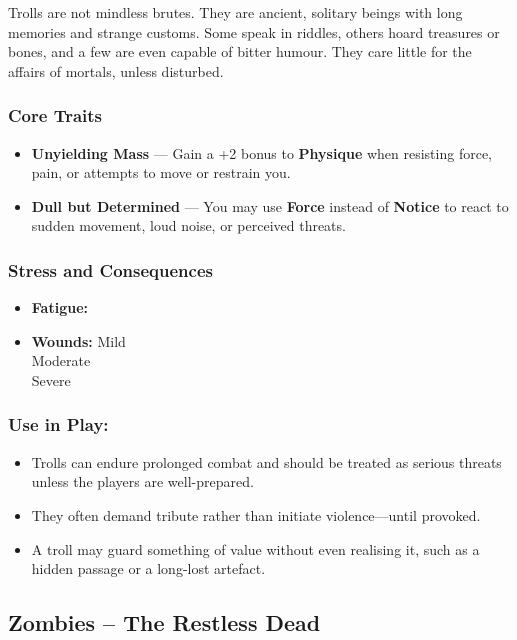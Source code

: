 Trolls are not mindless brutes. They are ancient, solitary beings with long memories and strange customs. Some speak in riddles, others hoard treasures or bones, and a few are even capable of bitter humour. They care little for the affairs of mortals, unless disturbed.

\subsubsection*{Core Traits}
\begin{itemize}
  \item \textbf{Unyielding Mass} — Gain a +2 bonus to \textbf{Physique} when resisting force, pain, or attempts to move or restrain you.

  \item \textbf{Dull but Determined} — You may use \textbf{Force} instead of \textbf{Notice} to react to sudden movement, loud noise, or perceived threats.
\end{itemize}

\subsubsection*{Stress and Consequences}
\begin{itemize}
  \item \textbf{Fatigue:} \FatigueBox \FatigueBox \FatigueBox
  \item \textbf{Wounds:} 
  Mild \MildWound \MildWound \MildWound  \\
  Moderate \ModerateWound \ModerateWound  \\
  Severe \SevereWound \SevereWound
\end{itemize}

\subsubsection*{Use in Play:}
\begin{itemize}
  \item Trolls can endure prolonged combat and should be treated as serious threats unless the players are well-prepared.
  \item They often demand tribute rather than initiate violence—until provoked.
  \item A troll may guard something of value without even realising it, such as a hidden passage or a long-lost artefact.
\end{itemize}

\subsection*{Zombies – The Restless Dead}

